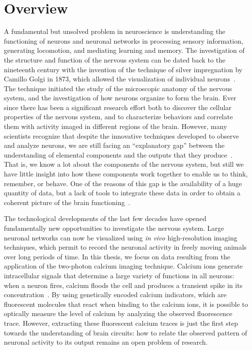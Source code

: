 

\section*{Overview}

A fundamental but unsolved problem in neuroscience is understanding the functioning of neurons and neuronal networks in processing sensory information, generating locomotion, and mediating learning and memory.
The investigation of the structure and function of the nervous system can be dated back to the nineteenth century with the invention of the technique of silver impregnation by Camillo Golgi in 1873, which allowed the visualization of individual neurons~\citep{drouin2015}. The technique initiated the study of the microscopic anatomy of the nervous system, and the investigation of how neurons organize to form the brain. 
Ever since there has been a significant research effort both to discover the cellular properties of the nervous system, and to characterize behaviors and correlate them with activity imaged in different regions of the brain.
However, many scientists recognize that despite the innovative techniques developed to observe and analyze neurons, we are still facing an ``explanatory gap'' between the understanding of elemental components and the outputs that they produce~\citep{parker2006,parker2010,dudai2004}. That is, we know a lot about the components of the nervous system, but still we have little insight into how these components work together to enable us to think, remember, or behave. One of the reasons of this gap is the availability of a huge quantity of data, but a lack of tools to integrate these data in order to obtain a coherent picture of the brain functioning~\citep{parker2010}.

The technological developments of the last few decades have opened fundamentally new opportunities to investigate the nervous system. Large neuronal networks can now be visualized using \textit{in vivo} high-resolution imaging techniques, which permit to record the neuronal activity in freely moving animals over long periods of time. In this thesis, we focus on data resulting from the application of the two-photon calcium imaging technique. Calcium ions generate intracellular signals that determine a large variety of functions in all neurons: when a neuron fires, calcium floods the cell and produces a transient spike in its concentration~\citep{grienberger2012}. By using genetically encoded calcium indicators, which are fluorescent molecules that react when binding to the calcium ions, it is possible to optically measure the level of calcium by analyzing the observed fluorescence trace. 
However, extracting these fluorescent calcium traces is just the first step towards the understanding of brain circuits: how to relate the observed pattern of neuronal activity to its output remains an open problem of research.



